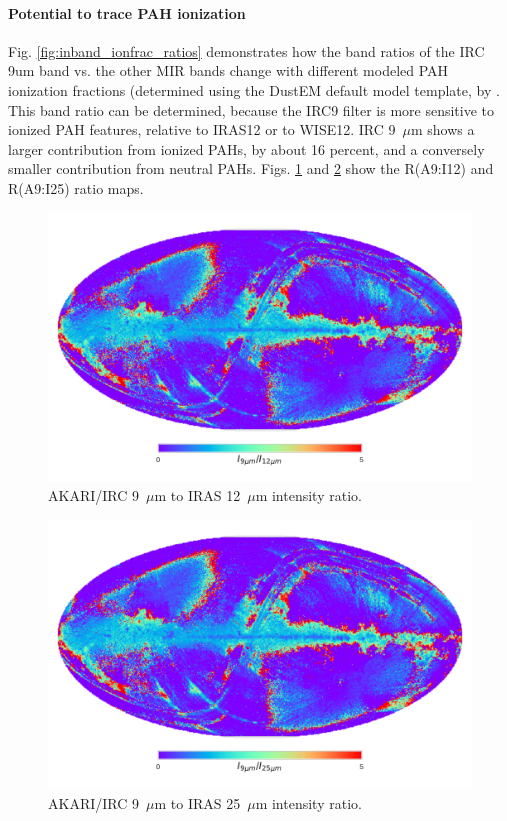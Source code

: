           \paragraph{Potential to trace PAH ionization}
            Fig. \ref{fig:inband_ionfrac_ratios} demonstrates how the band ratios of the IRC 9um band vs. the other MIR bands change with different modeled PAH ionization fractions (determined using the DustEM default model template, by \cite{dustem11}. This band ratio can be determined, because the IRC9 filter is more sensitive to ionized PAH features, relative to IRAS12 or to WISE12.
           IRC 9~$\mu$m shows a larger contribution from ionized PAHs, by about 16 percent, and a conversely smaller contribution from neutral PAHs. Figs. \ref{fig:ratioMap_A9I12} and \ref{fig:ratioMap_A9I25} show the R(A9:I12) and R(A9:I25) ratio maps.

           \begin{figure}
             \centering
             \includegraphics[width=\textwidth]{../Plots/ch_datasources/ratioMap_A9I12.pdf}
             \caption{ AKARI/IRC 9~$\mu$m to IRAS 12~$\mu$m intensity ratio.}
             \label{fig:ratioMap_A9I12}
           \end{figure}

           \begin{figure}
             \centering
             \includegraphics[width=\textwidth]{../Plots/ch_datasources/ratioMap_A9I25.pdf}
             \caption{ AKARI/IRC 9~$\mu$m to IRAS 25~$\mu$m intensity ratio.}
             \label{fig:ratioMap_A9I25}
           \end{figure}

